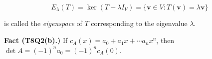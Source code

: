 \documentclass[10pt,landscape]{article}
\begin{document}
\begin{multicols}{4}
$$
E_{\lambda} (T) = \ker (T - \lambda I_V) = \{ \mathbf{v} \in V : T(\mathbf{v}) = \lambda \mathbf{v} \} 
$$

is called the \textit{eigenspace} of $T$ corresponding to the eigenvalue $\lambda$.

\textbf{Fact (T8Q2(b).)} If $c_A(x) = a_0 + a_1x + \cdots a_n x^n$, then $\det A = (-1)^n a_0 = (-1)^n c_A(0)$.













\end{multicols}
\end{document}
